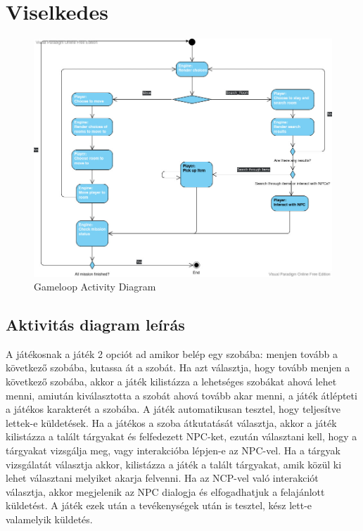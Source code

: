 \documentclass{scrarticle}
\begin{document}
\section{Viselkedes}
\begin{figure}[H]
    \includegraphics[width=1.0\columnwidth]{GameLoop_ActivityDiagram.jpg}
    \caption{Gameloop Activity Diagram}\label{fig:5}
\end{figure}
\subsection{Aktivitás diagram leírás}
A játékosnak a játék 2 opciót ad amikor belép egy szobába: menjen tovább a következő szobába, kutassa át a szobát. Ha azt választja, hogy tovább menjen a következő szobába, akkor a játék kilistázza a lehetséges szobákat ahová lehet menni, amiután kiválasztotta a szobát ahová tovább akar menni, a játék átlépteti a játékos karakterét a szobába. A játék automatikusan tesztel, hogy teljesítve lettek-e küldetések. Ha a játékos a szoba átkutatását választja, akkor a játék kilistázza a talált tárgyakat és felfedezett NPC-ket, ezután választani kell, hogy a tárgyakat vizsgálja meg, vagy interakcióba lépjen-e az NPC-vel. Ha a tárgyak vizsgálatát választja akkor, kilistázza a játék a talált tárgyakat, amik közül ki lehet választani melyiket akarja felvenni. Ha az NCP-vel való interakciót választja, akkor megjelenik az NPC dialogja és elfogadhatjuk a felajánlott küldetést. A játék ezek után a tevékenységek után is tesztel, kész lett-e valamelyik küldetés.
\end{document}
